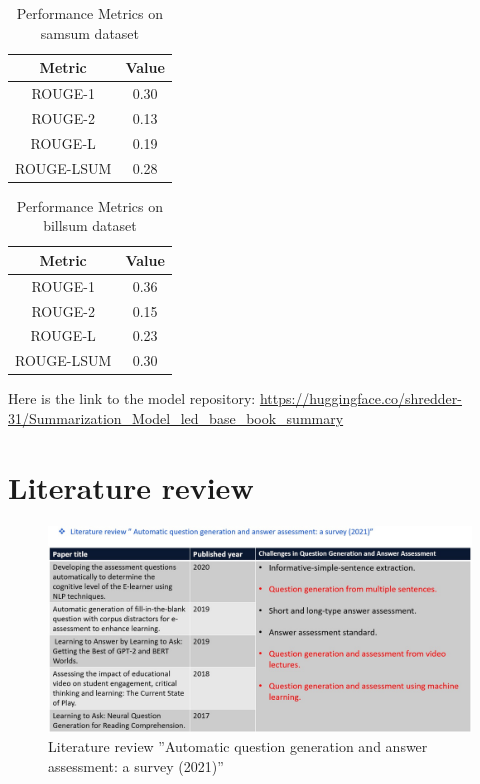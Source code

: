 \begin{table}[h!]
    \centering
    \begin{tabular}{|c|c|}
        \hline
        \textbf{Metric} & \textbf{Value} \\
        \hline
        ROUGE-1 & 0.30 \\
        \hline
        ROUGE-2 & 0.13 \\
        \hline
        ROUGE-L & 0.19 \\
        \hline
        ROUGE-LSUM & 0.28 \\
        \hline
    \end{tabular}
    \caption{Performance Metrics on samsum dataset}
    \label{tab:performance_metrics}
\end{table}


\begin{table}[h!]
    \centering
    \begin{tabular}{|c|c|}
        \hline
        \textbf{Metric} & \textbf{Value} \\
        \hline
        ROUGE-1 & 0.36 \\
        \hline
        ROUGE-2 & 0.15 \\
        \hline
        ROUGE-L & 0.23 \\
        \hline
        ROUGE-LSUM & 0.30 \\
        \hline
    \end{tabular}
    \caption{Performance Metrics on billsum dataset}
    \label{tab:performance_metrics}
\end{table}

\hfill \break
Here is the link to the model repository: \url{https://huggingface.co/shredder-31/Summarization_Model_led_base_book_summary}

\newpage
\section{Literature review}
\begin{figure}[h!]
\begin{center}
	\centering
        \includegraphics[width=1.2\textwidth]{figures/Literature review.png}
	\caption{Literature review ”Automatic question generation and answer assessment: a survey (2021)”}
\end{center}
\end{figure}




